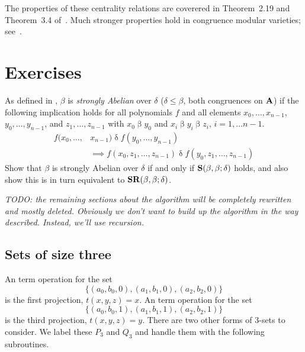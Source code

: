 The properties of these centrality relations are coverered in
Theorem~2.19 and Theorem~3.4 of~\cite{KearnesKiss2013}. Much stronger
properties hold in congruence modular varieties;
see~\cite{FreeseMcKenzie1987}.

\section*{Exercises}

\begin{exercises}

\prob
As defined in \cite{HobbyMcKenzie1988}, $\beta$ is \emph{strongly
Abelian} over $\delta$ ($\delta \leq \beta$, both congruences on $\mathbf{A}$)
if the following implication holds for all polynomials $f$ and all
elements $x_0, \ldots, x_{n-1}$, $y_0, \ldots, y_{n-1}$, and 
$z_1, \ldots, z_{n-1}$ with $x_0 \mathrel\beta y_0$ and
$x_i \mathrel\beta y_i \mathrel\beta z_i$, $i = 1, \ldots n-1$.
\begin{align*}
f(x_0,\ldots,&x_{n-1}) \mathrel\delta f(y_0,\ldots,y_{n-1}) \\
&\implies
f(x_0, z_1,\ldots,z_{n-1}) \mathrel\delta f(y_0, z_1,\ldots,z_{n-1})
\end{align*}
Show that $\beta$ is strongly 
Abelian over $\delta$ if and only if $\mathbf{S}(\beta,\beta;\delta)$ 
holds, and also show this is in turn equivalent to
$\mathbf{SR}(\beta,\beta;\delta)$.
\end{exercises}




\noindent \emph{TODO: the remaining sections about the algorithm will be completely
rewritten and mostly deleted.  Obviously we don't want to build up the 
algorithm in the way described.  Instead, we'll use recursion.}

\subsection{Sets of size three}
An \ld term operation for the set
\begin{equation*}
\{(a_0,b_0, 0), (a_1, b_1, 0), (a_2, b_2, 0)\}
\end{equation*}
is the first projection, $t(x,y,z) = x$.
An \ld term operation for the set
\begin{equation*}
\{(a_0,b_0,1), (a_1, b_1, 1), (a_2, b_2, 1)\}
\end{equation*}
is the third projection, $t(x,y,z) = y$.
There are two other forms of 3-sets to consider.
We label these $P_3$ and $Q_3$ and handle them with 
the following subroutines.


